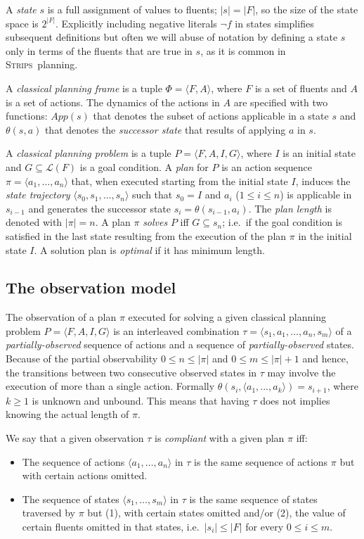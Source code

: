 \documentclass[letterpaper]{article} %
\newcommand{\tup}[1]{{\langle #1 \rangle}}
\newcommand{\strips}{\textsc{Strips}}     %
\begin{document}
A {\em state} $s$ is a full assignment of values to fluents; $|s|=|F|$, so the size of the state space is $2^{|F|}$. Explicitly including negative literals $\neg f$ in states simplifies subsequent definitions but often we will abuse of notation by defining a state $s$ only in terms of the fluents that are true in $s$, as it is common in \strips\ planning.

A {\em classical planning frame} is a tuple $\Phi=\tup{F,A}$, where $F$ is a set of fluents and $A$ is a set of actions. The dynamics of the actions in $A$ are specified with two functions: $App(s)$ that denotes the subset of actions applicable in a state $s$ and $\theta(s,a)$ that denotes the {\em successor state} that results of applying $a$ in $s$.

A {\em classical planning problem} is a tuple $P=\tup{F,A,I,G}$, where $I$ is an initial state and $G\subseteq\mathcal{L}(F)$ is a goal condition. A {\em plan} for $P$ is an action sequence $\pi=\tup{a_1, \ldots, a_n}$ that, when executed starting from the initial state $I$, induces the {\em state trajectory} $\tup{s_0, s_1, \ldots, s_n}$ such that $s_0=I$ and $a_i$ ({\small $1\leq i\leq n$}) is applicable in $s_{i-1}$ and generates the successor state $s_i=\theta(s_{i-1},a_i)$. The {\em plan length} is denoted with $|\pi|=n$. A plan $\pi$ {\em solves} $P$ iff $G\subseteq s_n$; i.e.~if the goal condition is satisfied in the last state resulting from the execution of the plan $\pi$ in the initial state $I$. A solution plan is {\em optimal} if it has minimum length.

\subsection{The observation model}
The observation of a plan $\pi$ executed for solving a given classical planning problem $P=\tup{F,A,I,G}$ is an interleaved combination $\tau=\tup{s_1, a_1, \ldots , a_n, s_m}$ of a {\em partially-observed} sequence of actions and a sequence of {\em partially-observed} states. Because of the partial observability $0\leq n\leq |\pi|$ and $0\leq m\leq |\pi|+1$ and hence, the transitions between two consecutive observed states in $\tau$ may involve the execution of more than a single action. Formally $\theta(s_i,\tup{a_1,\ldots,a_k})=s_{i+1}$, where $k\geq 1$ is unknown and unbound. This means that having $\tau$ does not implies knowing the actual length of $\pi$.

We say that a given observation $\tau$ is {\em compliant} with a given plan $\pi$ iff:
\begin{itemize}
\item The sequence of actions $\tup{a_1, \ldots, a_n}$ in $\tau$ is the same sequence of actions $\pi$ but with certain actions omitted.
\item The sequence of states $\tup{s_1, \ldots, s_m}$ in $\tau$ is the same sequence of states traversed by $\pi$ but (1), with certain states omitted and/or (2), the value of certain fluents omitted in that states, i.e.~$|s_i|\leq |F|$ for every $0\leq i\leq m$.
\end{itemize}
\end{document}
